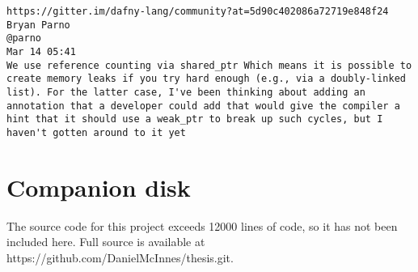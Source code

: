 \documentclass[12pt,openany,a4paper]{book}
\begin{document}
\label{dafnybug2}
\begin{verbatim}
https://gitter.im/dafny-lang/community?at=5d90c402086a72719e848f24
Bryan Parno
@parno
Mar 14 05:41
We use reference counting via shared_ptr Which means it is possible to create memory leaks if you try hard enough (e.g., via a doubly-linked list). For the latter case, I've been thinking about adding an annotation that a developer could add that would give the compiler a hint that it should use a weak_ptr to break up such cycles, but I haven't gotten around to it yet
\end{verbatim}

\chapter{Companion disk}
The source code for this project exceeds 12000 lines of code, so it has not been included here. Full source is available at https://github.com/DanielMcInnes/thesis.git.

\nocite{*}


\end{document}
